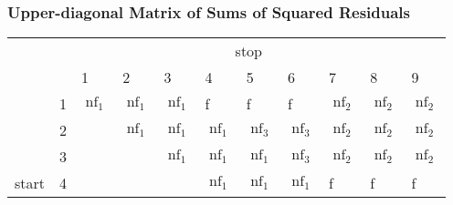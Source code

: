\documentclass[presentation.tex]{subfiles}
\begin{document}
\begin{frame}[fragile]
  \frametitle{Upper-diagonal Matrix of Sums of Squared Residuals}
\begin{table}[]
\begin{tabular}{lllllllllll}
                                   & \multicolumn{10}{c}{stop}                                                                                                                                                                                                                                                 \\ \cline{2-11} 
\multicolumn{1}{l|}{}              & \multicolumn{1}{l|}{}  & \multicolumn{1}{l|}{1}    & \multicolumn{1}{l|}{2}    & \multicolumn{1}{l|}{3}    & \multicolumn{1}{l|}{4}    & \multicolumn{1}{l|}{5}    & \multicolumn{1}{l|}{6}    & \multicolumn{1}{l|}{7}    & \multicolumn{1}{l|}{8}    & \multicolumn{1}{l|}{9}    \\ \cline{2-11} 
\multicolumn{1}{l|}{}              & \multicolumn{1}{l|}{1} & \multicolumn{1}{l|}{$\operatorname{nf}_1$} & \multicolumn{1}{l|}{$\operatorname{nf}_1$} & \multicolumn{1}{l|}{$\operatorname{nf}_1$} & \multicolumn{1}{l|}{f}   & \multicolumn{1}{l|}{f}   & \multicolumn{1}{l|}{f}   & \multicolumn{1}{l|}{$\operatorname{nf}_2$} & \multicolumn{1}{l|}{$\operatorname{nf}_2$} & \multicolumn{1}{l|}{$\operatorname{nf}_2$} \\ \cline{2-11} 
\multicolumn{1}{l|}{}              & \multicolumn{1}{l|}{2} & \multicolumn{1}{l|}{}     & \multicolumn{1}{l|}{$\operatorname{nf}_1$} & \multicolumn{1}{l|}{$\operatorname{nf}_1$} & \multicolumn{1}{l|}{$\operatorname{nf}_1$} & \multicolumn{1}{l|}{$\operatorname{nf}_3$} & \multicolumn{1}{l|}{$\operatorname{nf}_3$} & \multicolumn{1}{l|}{$\operatorname{nf}_2$} & \multicolumn{1}{l|}{$\operatorname{nf}_2$} & \multicolumn{1}{l|}{$\operatorname{nf}_2$} \\ \cline{2-11} 
\multicolumn{1}{l|}{}              & \multicolumn{1}{l|}{3} & \multicolumn{1}{l|}{}     & \multicolumn{1}{l|}{}     & \multicolumn{1}{l|}{$\operatorname{nf}_1$} & \multicolumn{1}{l|}{$\operatorname{nf}_1$} & \multicolumn{1}{l|}{$\operatorname{nf}_1$} & \multicolumn{1}{l|}{$\operatorname{nf}_3$} & \multicolumn{1}{l|}{$\operatorname{nf}_2$} & \multicolumn{1}{l|}{$\operatorname{nf}_2$} & \multicolumn{1}{l|}{$\operatorname{nf}_2$} \\ \cline{2-11} 
\multicolumn{1}{l|}{start} & \multicolumn{1}{l|}{4} & \multicolumn{1}{l|}{}     & \multicolumn{1}{l|}{}     & \multicolumn{1}{l|}{}     & \multicolumn{1}{l|}{$\operatorname{nf}_1$} & \multicolumn{1}{l|}{$\operatorname{nf}_1$} & \multicolumn{1}{l|}{$\operatorname{nf}_1$} & \multicolumn{1}{l|}{f}   & \multicolumn{1}{l|}{f}   & \multicolumn{1}{l|}{f}   \\ \cline{2-11} 

\end{tabular}
\end{table}
\end{frame}
\end{document}
